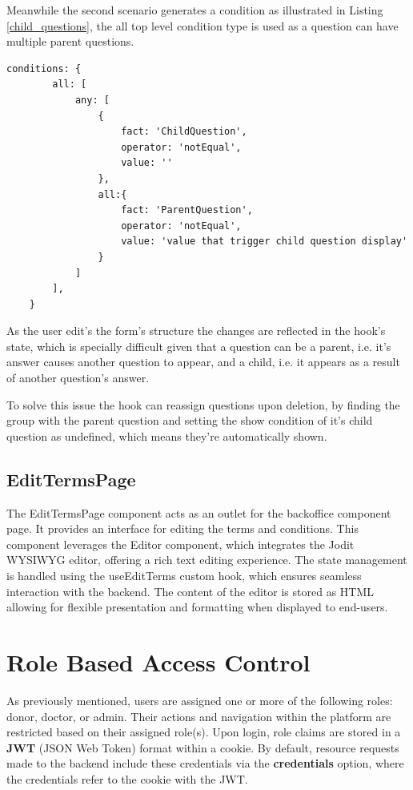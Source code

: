 Meanwhile the second scenario generates a condition as illustrated in Listing \ref{child_questions}, the all top level condition type is used as a question can have multiple parent questions.

\begin{lstlisting}[style=sharpc, caption={Condition generated by a child questions}, label={child_questions}]
	conditions: {
		all: [
			any: [
				{
					fact: 'ChildQuestion',
					operator: 'notEqual',
					value: ''
				},
				all:{
					fact: 'ParentQuestion',
					operator: 'notEqual',
					value: 'value that trigger child question display'
				}
			]
		],
	}
\end{lstlisting}


As the user edit's the form's structure the changes are reflected in the hook's state, which is specially difficult given that a question can be a parent, i.e. it's answer causes another question to appear, and a child, i.e. it appears as a result of another question's answer.

To solve this issue the hook can reassign questions upon deletion, by finding the group with the parent question and setting the show condition of it's child question as undefined, which means they're automatically shown.

\subsection{EditTermsPage}

The EditTermsPage component acts as an outlet for the backoffice component page. It provides an interface for editing the terms and conditions. This component leverages the Editor component, which integrates the Jodit WYSIWYG editor, offering a rich text editing experience. The state management is handled using the useEditTerms custom hook, which ensures seamless interaction with the backend.
The content of the editor is stored as HTML allowing for flexible presentation and formatting when displayed to end-users.


\newpage


\section{Role Based Access Control}
As previously mentioned, users are assigned one or more of the following roles: donor, doctor, or admin. Their actions and navigation within the platform are restricted based on their assigned role(s). Upon login, role claims are stored in a \textbf{JWT} (JSON Web Token) format within a cookie. By default, resource requests made to the backend include these credentials via the \textbf{credentials} option, where the credentials refer to the cookie with the JWT.


